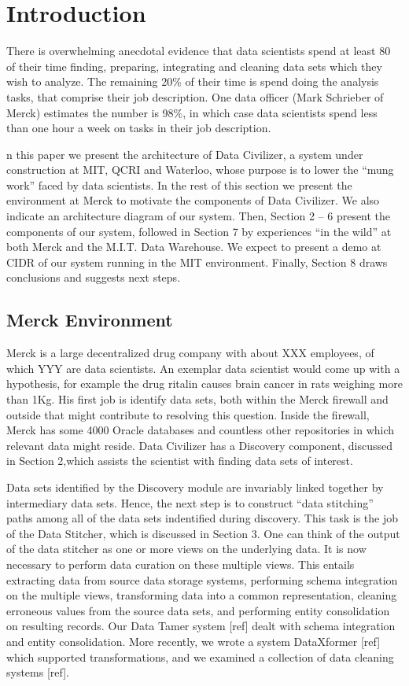 \section{Introduction}
\label{introduction}

There is overwhelming anecdotal evidence that data scientists spend at least 80%
of their time finding, preparing, integrating and cleaning data sets which they
wish to analyze. The remaining 20\% of their time is spend doing the analysis
tasks, that comprise their job description.  One data officer (Mark Schrieber of
Merck) estimates the number is 98\%, in which case data scientists spend less
than one hour a week on tasks in their job description.

n this paper we present the architecture of Data Civilizer, a system under
construction at MIT, QCRI and Waterloo, whose purpose is to lower the “mung
work” faced by data scientists.  In the rest of this section we present the
environment at Merck to motivate the components of Data Civilizer.  We also
indicate an architecture diagram of our system.  Then, Section 2 – 6 present the
components of our system, followed in Section 7 by experiences “in the wild” at
both Merck and the M.I.T. Data Warehouse.  We expect to present a demo at CIDR
of our system running in the MIT environment.   Finally, Section 8 draws
conclusions and suggests next steps.

\subsection{Merck Environment}

Merck is a large decentralized drug company with about XXX employees, of which
YYY are data scientists.  An exemplar data scientist would come up with a
hypothesis, for example the drug ritalin causes brain cancer in rats weighing
more than 1Kg.  His first job is identify data sets, both within the Merck
firewall and outside that might contribute to resolving this question.  Inside
the firewall, Merck has some 4000 Oracle databases and countless other
repositories in which relevant data might reside.  Data Civilizer has a
Discovery component, discussed in Section 2,which assists the scientist with
finding data sets of interest.

Data sets identified by the Discovery module are invariably linked together by
intermediary data sets.  Hence, the next step is to construct  “data stitching”
paths among all of the data sets indentified during discovery.  This task is the
job of the Data Stitcher, which is discussed in Section 3. One can think of the
output of the data stitcher as one or more views on the underlying data. It is
now necessary to perform data curation on these multiple views.  This entails
extracting data from source data storage systems, performing schema integration
on the multiple views, transforming data into a common representation, cleaning
erroneous values from the source data sets, and performing entity consolidation
on resulting records.  Our Data Tamer system [ref] dealt with schema integration
and entity consolidation.  More recently, we wrote a system DataXformer [ref]
which supported transformations, and we examined a collection of data cleaning
systems [ref].  

